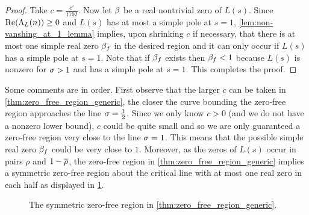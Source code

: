 \documentclass[12pt]{article}
\begin{document}
\begin{proof}
      Take \(c = \frac{c'}{1792}\). Now let \(\beta\) be a real nontrivial zero of \(L(s)\). Since \(\mathrm{Re}(\Lambda_{L}(n)) \ge 0\) and \(L(s)\) has at most a simple pole at \(s = 1\), \cref{lem:non-vanshing_at_1_lemma} implies, upon shrinking \(c\) if necessary, that there is at most one simple real zero \(\beta_{f}\) in the desired region and it can only occur if \(L(s)\) has a simple pole at \(s = 1\). Note that if \(\beta_{f}\) exists then \(\beta_{f} < 1\) because \(L(s)\) is nonzero for \(\sigma > 1\) and has a simple pole at \(s = 1\). This completes the proof.
    \end{proof}
    
    Some comments are in order. First observe that the larger \(c\) can be taken in \cref{thm:zero_free_region_generic}, the closer the curve bounding the zero-free region approaches the line \(\sigma = \frac{1}{2}\). Since we only know \(c > 0\) (and we do not have a nonzero lower bound), \(c\) could be quite small and so we are only guaranteed a zero-free region very close to the line \(\sigma = 1\). This means that the possible simple real zero \(\beta_{f}\) could be very close to \(1\). Moreover, as the zeros of \(L(s)\) occur in pairs \(\rho\) and \(1-\overline{\rho}\), the zero-free region in \cref{thm:zero_free_region_generic} implies a symmetric zero-free region about the critical line with at most one real zero in each half as displayed in \cref{fig:symmetric_zero_free_region}.

    \begin{figure}[ht]
      \centering
      \caption{The symmetric zero-free region in \cref{thm:zero_free_region_generic}.}
      \label{fig:symmetric_zero_free_region}
    \end{figure}
\end{document}
